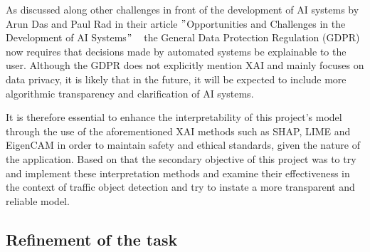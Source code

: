 As discussed along other challenges in front of the development of AI systems by Arun Das and Paul Rad in their article
\("\)Opportunities and Challenges in the Development of AI Systems\("\) ~\cite{das2020opportunitieschallengesexplainableartificial}
the General Data Protection Regulation (GDPR) now requires that decisions made by automated systems be
explainable to the user.
Although the GDPR does not explicitly mention XAI and mainly focuses on data privacy,
it is likely that in the future, it will be expected to include more algorithmic transparency and clarification of AI systems.


It is therefore essential to enhance the interpretability of this project's model through the use of the aforementioned
XAI methods such as SHAP, LIME and EigenCAM in order to maintain safety and ethical standards, given the nature of the
application.
Based on that the secondary objective of this project was to try and implement these interpretation methods and examine their
effectiveness in the context of traffic object detection and try to instate a more transparent and reliable model.

\subsection{Refinement of the task}\label{subsec:Refinement-of-the-task} %

